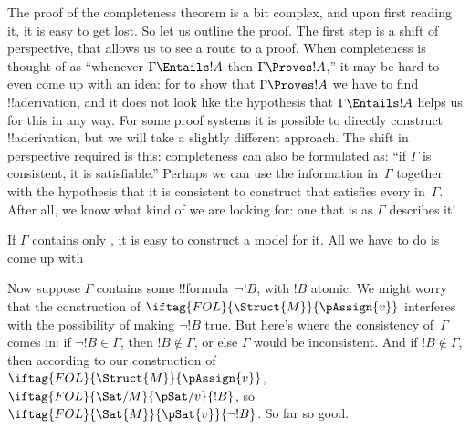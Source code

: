 \documentclass[../../../include/open-logic-section]{subfiles}
\begin{document}
      {}
      {}

The proof of the completeness theorem is a bit complex, and upon first
reading it, it is easy to get lost.  So let us outline the proof.  The
first step is a shift of perspective, that allows us to see a route to
a proof.  When completeness is thought of as ``whenever $\Gamma
\Entails !A$ then $\Gamma \Proves !A$,'' it may be hard to even come
up with an idea: for to show that $\Gamma \Proves !A$ we have to find
!!a{derivation}, and it does not look like the hypothesis that
$\Gamma \Entails !A$ helps us for this in any way.  For some proof
systems it is possible to directly construct !!a{derivation}, but we
will take a slightly different approach.  The shift in perspective
required is this: completeness can also be formulated as: ``if
$\Gamma$ is consistent, it is satisfiable.''  Perhaps we can use the
information in~$\Gamma$ together with the hypothesis that it is
consistent to construct 
that satisfies every 
in~$\Gamma$.  After all, we know
what kind of  we are looking
for: one that is as $\Gamma$ describes it!{}

If $\Gamma$ contains only , it is easy to construct
a model for it. All we have to do is come up with

Now suppose $\Gamma$ contains some !!{formula}~$\lnot !B$, with $!B$
atomic.  We might worry that the construction of
$\iftag{FOL}{\Struct{M}}{\pAssign{v}}$ interferes with the possibility
of making $\lnot !B$ true.  But here's where the consistency
of~$\Gamma$ comes in: if $\lnot !B \in \Gamma$, then $!B \notin
\Gamma$, or else $\Gamma$ would be inconsistent.  And if $!B \notin
\Gamma$, then according to our construction
of~$\iftag{FOL}{\Struct{M}}{\pAssign{v}}$,
$\iftag{FOL}{\Sat/{M}}{\pSat/{v}}{!B}$, so
$\iftag{FOL}{\Sat{M}}{\pSat{v}}{\lnot !B}$.  So far so good.
\end{document}
